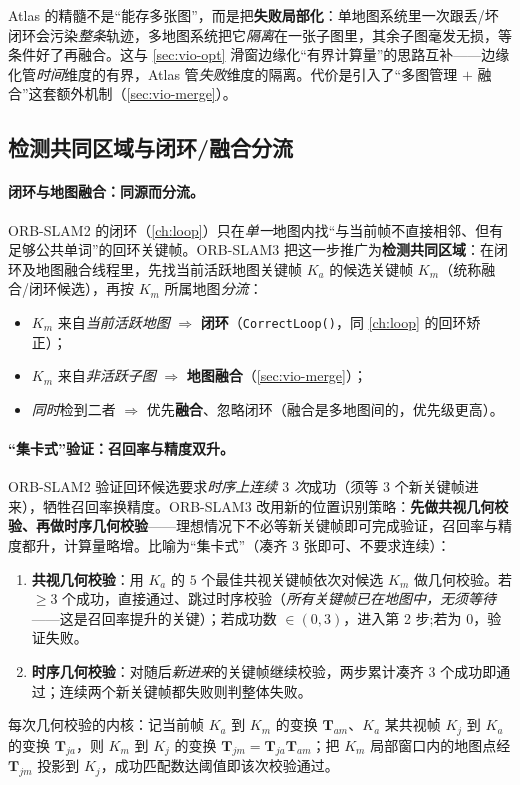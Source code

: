 \begin{insight}
Atlas 的精髓不是“能存多张图”，而是把\textbf{失败局部化}：单地图系统里一次跟丢/坏闭环会污染\emph{整条}轨迹，多地图系统把它\emph{隔离}在一张子图里，其余子图毫发无损，等条件好了再融合。这与 \cref{sec:vio-opt} 滑窗边缘化“有界计算量”的思路互补——边缘化管\emph{时间}维度的有界，Atlas 管\emph{失败}维度的隔离。代价是引入了“多图管理 $+$ 融合”这套额外机制（\cref{sec:vio-merge}）。
\end{insight}

\subsection{检测共同区域与闭环/融合分流}
\label{sec:vio-merge-detect}

\paragraph{闭环与地图融合：同源而分流。}
ORB-SLAM2 的闭环（\cref{ch:loop}）只在\emph{单一}地图内找“与当前帧不直接相邻、但有足够公共单词”的回环关键帧。ORB-SLAM3 把这一步推广为\textbf{检测共同区域}\cite{campos2021orbslam3}：在闭环及地图融合线程里，先找当前活跃地图关键帧 $K_a$ 的候选关键帧 $K_m$（统称融合/闭环候选），再按 $K_m$ 所属地图\emph{分流}：
\begin{itemize}
  \item $K_m$ 来自\emph{当前活跃地图} $\Rightarrow$ \textbf{闭环}（\texttt{CorrectLoop()}，同 \cref{ch:loop} 的回环矫正）；
  \item $K_m$ 来自\emph{非活跃子图} $\Rightarrow$ \textbf{地图融合}（\cref{sec:vio-merge}）；
  \item \emph{同时}检到二者 $\Rightarrow$ 优先\textbf{融合}、忽略闭环（融合是多地图间的，优先级更高）。
\end{itemize}

\paragraph{“集卡式”验证：召回率与精度双升。}
ORB-SLAM2 验证回环候选要求\emph{时序上连续 $3$ 次}成功（须等 $3$ 个新关键帧进来），牺牲召回率换精度。ORB-SLAM3 改用新的位置识别策略\cite{campos2021orbslam3}：\textbf{先做共视几何校验、再做时序几何校验}——理想情况下不必等新关键帧即可完成验证，召回率与精度都升，计算量略增。比喻为“集卡式”（凑齐 $3$ 张即可、不要求连续）：
\begin{enumerate}
  \item \textbf{共视几何校验}：用 $K_a$ 的 $5$ 个最佳共视关键帧依次对候选 $K_m$ 做几何校验。若 $\ge 3$ 个成功，直接通过、跳过时序校验（\emph{所有关键帧已在地图中，无须等待}——这是召回率提升的关键）；若成功数 $\in(0,3)$，进入第 2 步;若为 $0$，验证失败。
  \item \textbf{时序几何校验}：对随后\emph{新进来}的关键帧继续校验，两步累计凑齐 $3$ 个成功即通过；连续两个新关键帧都失败则判整体失败。
\end{enumerate}
每次几何校验的内核：记当前帧 $K_a$ 到 $K_m$ 的变换 $\mathbf{T}_{am}$、$K_a$ 某共视帧 $K_j$ 到 $K_a$ 的变换 $\mathbf{T}_{ja}$，则 $K_m$ 到 $K_j$ 的变换 $\mathbf{T}_{jm}=\mathbf{T}_{ja}\mathbf{T}_{am}$；把 $K_m$ 局部窗口内的地图点经 $\mathbf{T}_{jm}$ 投影到 $K_j$，成功匹配数达阈值即该次校验通过。

